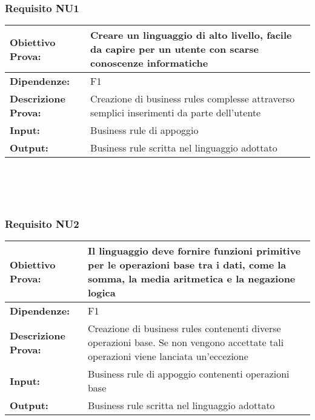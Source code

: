 \subsubsection{Requisito NU1}
\begin{tabular}{||p{4cm}||p{8cm}||}
\hline
{\textbf {Obiettivo Prova:}}& Creare un linguaggio di alto livello, facile da capire per un utente con scarse conoscenze informatiche\\ \hline
{\textbf{Dipendenze:}}& F1\\ \hline
{\textbf{Descrizione Prova:}}& Creazione di business rules complesse attraverso semplici inserimenti da parte dell'utente\\ \hline
{\textbf{Input:}}& Business rule di appoggio \\ \hline
{\textbf{Output:}}& Business rule scritta nel linguaggio adottato \\ \hline
\end{tabular} \\
\\
\\
\subsubsection{Requisito NU2}
\begin{tabular}{||p{4cm}||p{8cm}||}
\hline
{\textbf {Obiettivo Prova:}}& Il linguaggio deve fornire funzioni primitive per le operazioni base tra i dati, come la somma, la media aritmetica e la negazione logica \\ \hline
{\textbf{Dipendenze:}}& F1 \\ \hline
{\textbf{Descrizione Prova:}}&  Creazione di business rules contenenti diverse operazioni base. Se non vengono accettate tali operazioni viene lanciata un'eccezione \\ \hline
{\textbf{Input:}}&  Business rule di appoggio contenenti operazioni base \\ \hline
{\textbf{Output:}}& Business rule scritta nel linguaggio adottato \\ \hline
\end{tabular} \\
\\
\\
